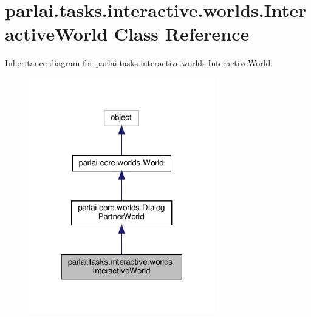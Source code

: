 \hypertarget{classparlai_1_1tasks_1_1interactive_1_1worlds_1_1InteractiveWorld}{}\section{parlai.\+tasks.\+interactive.\+worlds.\+Interactive\+World Class Reference}
\label{classparlai_1_1tasks_1_1interactive_1_1worlds_1_1InteractiveWorld}


Inheritance diagram for parlai.\+tasks.\+interactive.\+worlds.\+Interactive\+World\+:\nopagebreak
\begin{figure}[H]
\begin{center}
\leavevmode
\includegraphics[width=229pt]{d4/dba/classparlai_1_1tasks_1_1interactive_1_1worlds_1_1InteractiveWorld__inherit__graph}
\end{center}
\end{figure}


